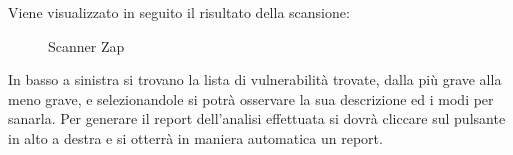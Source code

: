 Viene visualizzato in seguito il risultato della scansione: 
\begin{figure}[H]
    \caption{Scanner Zap}
    \label{fig:scanzap}
\end{figure}
In basso a sinistra si trovano la lista di vulnerabilità trovate, dalla più grave alla meno grave, e selezionandole si potrà osservare la sua descrizione ed i modi per sanarla.
Per generare il report dell’analisi effettuata si dovrà cliccare sul pulsante in alto a destra e si otterrà in maniera automatica un report. 

